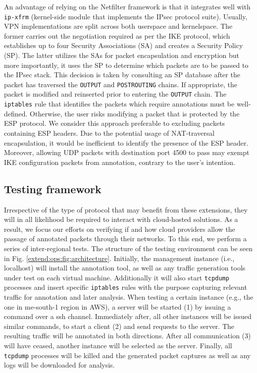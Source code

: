 An advantage of relying on the Netfilter framework is that it integrates well with \texttt{ip-xfrm} (kernel-side module that implements the IPsec protocol suite). Usually, VPN implementations are split across both userspace and kernelspace. The former carries out the negotiation required as per the IKE protocol, which establishes up to four Security Associations (SA) and creates a Security Policy (SP). The latter utilizes the SAs for packet encapsulation and encryption but more importantly, it uses the SP to determine which packets are to be passed to the IPsec stack. This decision is taken by consulting an SP database after the packet has traversed the \texttt{OUTPUT} and \texttt{POSTROUTING} chains. If appropriate, the packet is modified and reinserted prior to entering the \texttt{OUTPUT} chain. The \texttt{iptables} rule that identifies the packets which require annotations must be well-defined. Otherwise, the user risks modifying a packet that is protected by the ESP protocol. We consider this approach preferable to excluding packets containing ESP headers. Due to the potential usage of NAT-traversal encapsulation, it would be inefficient to identify the presence of the ESP header. Moreover, allowing UDP packets with destination port 4500 to pass may exempt IKE configuration packets from annotation, contrary to the user's intention.

\subsection{Testing framework}

Irrespective of the type of protocol that may benefit from these extensions, they will in all likelihood be required to interact with cloud-hosted solutions. As a result, we focus our efforts on verifying if and how cloud providers allow the passage of annotated packets through their networks. To this end, we perform a series of inter-regional tests. The structure of the testing environment can be seen in Fig. \ref{extend:ops:fig:architecture}. Initially, the management instance (i.e., localhost) will install the annotation tool, as well as any traffic generation tools under test on each virtual machine. Additionally it will also start \texttt{tcpdump} processes and insert specific \texttt{iptables} rules with the purpose capturing relevant traffic for annotation and later analysis. When testing a certain instance (e.g., the one in me-south-1 region in AWS), a server will be started (1) by issuing a command over a ssh channel. Immediately after, all other instances will be issued similar commands, to start a client (2) and send requests to the server. The resulting traffic will be annotated in both directions. After all communication (3) will have ceased, another instance will be selected as the server. Finally, all \texttt{tcpdump} processes will be killed and the generated packet captures as well as any logs will be downloaded for analysis.

